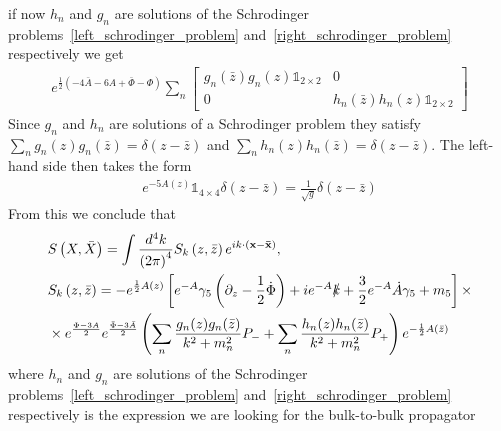 \documentclass[12pt,a4paper]{article}
\begin{document}
if now $h_n$ and $g_n$ are solutions of the Schrodinger problems~\ref{left_schrodinger_problem} and~\ref{right_schrodinger_problem} respectively we get
\begin{align}
    e^{\frac{1}{2} \left( - 4 \bar{A} - 6 A + \bar{\Phi}-\Phi \right)}\sum_n
    \begin{bmatrix}
        g_n\left(\bar{z}\right)g_n\left(z\right)\mathds{1}_{2\times 2} & 0 \\
        0 & h_n\left(\bar{z}\right)h_n\left(z\right)\mathds{1}_{2\times 2}
    \end{bmatrix}
\end{align}
Since $g_n$ and $h_n$ are solutions of a Schrodinger problem they satisfy $\sum_n g_n \left(z\right) g_n \left(\bar{z}\right) = \delta \left( z - \bar{z} \right)$ and $\sum_n h_n \left(z\right) h_n \left(\bar{z}\right) = \delta \left( z - \bar{z} \right)$. The left-hand side then takes the form
\begin{align}
    e^{-5 A\left(z\right)} \mathds{1}_{4\times4} \delta\left( z - \bar{z} \right) = \frac{1}{\sqrt{g}} \delta\left( z - \bar{z} \right)
\end{align}
From this we conclude that
\begin{align}
    & S\left(X,\bar{X}\right) = \int \frac{d^4 k}{{\left(2\pi\right)}^4} S_k \left(z,\bar{z}\right) e^{i k \cdot \left(\mathbf{x}-\mathbf{\bar{x}}\right)}, \\
    &S_k \left(z, \bar{z}\right) = - e^{\frac{1}{2}A\left(z\right)} \left[ e^{-A} \gamma_5 \left( \partial_z - \frac{1}{2} \dot{\Phi} \right) + i e^{-A} \slashed{k} + \frac{3}{2} e^{-A} \dot{A} \gamma_5 + m_5 \right] \times \\ \notag
    & \times e^{\frac{\Phi-3 A}{2}}e^{\frac{\bar{\Phi}-3 \bar{A}}{2}} \left( \sum_n \frac{g_n(z)g_n(\bar{z})}{k^2+ m_n^2} P_{-} + \sum_n \frac{h_n(z)h_n(\bar{z})}{k^2+ m_n^2} P_{+} \right)e^{-\frac{1}{2}A\left(\bar{z}\right)} \notag
\end{align}
where $h_n$ and $g_n$ are solutions of the Schrodinger problems~\ref{left_schrodinger_problem} and~\ref{right_schrodinger_problem} respectively is the expression we are looking for the bulk-to-bulk propagator
\end{document}
